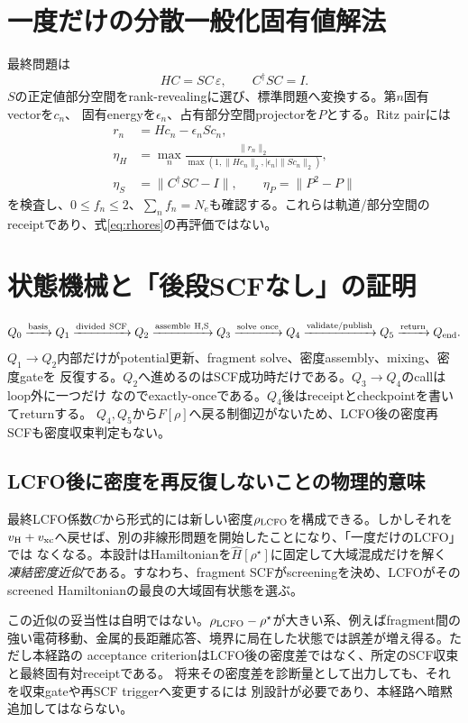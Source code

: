 \documentclass[11pt,a4paper]{article}
\begin{document}
\section{一度だけの分散一般化固有値解法}
最終問題は
\begin{equation}
 HC=SC\,\varepsilon,\qquad C^\dagger SC=I.
 \label{eq:final}
\end{equation}
$S$の正定値部分空間をrank-revealingに選び、標準問題へ変換する。第$n$固有vectorを$c_n$、
固有energyを$\epsilon_n$、占有部分空間projectorを$P$とする。Ritz pairには
\begin{align}
 r_n&=Hc_n-\epsilon_nSc_n,\\
 \eta_H&=\max_n\frac{\|r_n\|_2}
 {\max(1,\|Hc_n\|_2,|\epsilon_n|\|Sc_n\|_2)},\\
 \eta_S&=\|C^\dagger SC-I\|,\qquad \eta_P=\|P^2-P\|
\end{align}
を検査し、$0\le f_n\le2$、$\sum_nf_n=N_e$も確認する。これらは軌道/部分空間の
receiptであり、式\eqref{eq:rhores}の再評価ではない。

\section{状態機械と「後段SCFなし」の証明}
\begin{equation}
 Q_0\xrightarrow{\rm basis}Q_1\xrightarrow{\rm divided\ SCF}Q_2
 \xrightarrow{\rm assemble\ H,S}Q_3\xrightarrow{\rm solve\ once}Q_4
 \xrightarrow{\rm validate/publish}Q_5\xrightarrow{\rm return}Q_{\rm end}.
\end{equation}
$Q_1\to Q_2$内部だけがpotential更新、fragment solve、密度assembly、mixing、密度gateを
反復する。$Q_2$へ進めるのはSCF成功時だけである。$Q_3\to Q_4$のcallはloop外に一つだけ
なのでexactly-onceである。$Q_4$後はreceiptとcheckpointを書いてreturnする。
$Q_4,Q_5$から$F[\rho]$へ戻る制御辺がないため、LCFO後の密度再SCFも密度収束判定もない。

\subsection{LCFO後に密度を再反復しないことの物理的意味}
最終LCFO係数$C$から形式的には新しい密度$\rho_{\rm LCFO}$を構成できる。しかしそれを
$v_{\rm H}+v_{\rm xc}$へ戻せば、別の非線形問題を開始したことになり、「一度だけのLCFO」では
なくなる。本設計はHamiltonianを$\hat H[\rho^\star]$に固定して大域混成だけを解く
\emph{凍結密度近似}である。すなわち、fragment SCFがscreeningを決め、LCFOがそのscreened
Hamiltonianの最良の大域固有状態を選ぶ。

この近似の妥当性は自明ではない。$\rho_{\rm LCFO}-\rho^\star$が大きい系、例えばfragment間の
強い電荷移動、金属的長距離応答、境界に局在した状態では誤差が増え得る。ただし本経路の
acceptance criterionはLCFO後の密度差ではなく、所定のSCF収束と最終固有対receiptである。
将来その密度差を診断量として出力しても、それを収束gateや再SCF triggerへ変更するには
別設計が必要であり、本経路へ暗黙追加してはならない。
\end{document}
